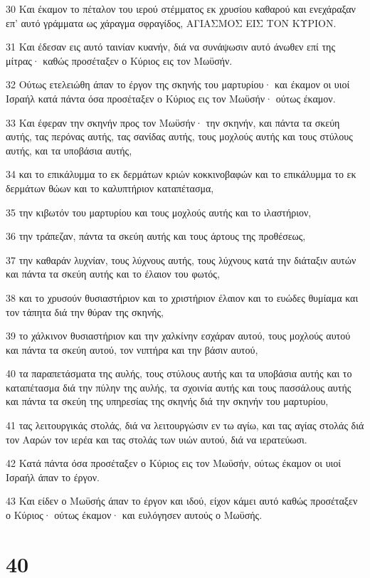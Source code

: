 \par 30 Και έκαμον το πέταλον του ιερού στέμματος εκ χρυσίου καθαρού και ενεχάραξαν επ' αυτό γράμματα ως χάραγμα σφραγίδος, ΑΓΙΑΣΜΟΣ ΕΙΣ ΤΟΝ ΚΥΡΙΟΝ.
\par 31 Και έδεσαν εις αυτό ταινίαν κυανήν, διά να συνάψωσιν αυτό άνωθεν επί της μίτρας· καθώς προσέταξεν ο Κύριος εις τον Μωϋσήν.
\par 32 Ούτως ετελειώθη άπαν το έργον της σκηνής του μαρτυρίου· και έκαμον οι υιοί Ισραήλ κατά πάντα όσα προσέταξεν ο Κύριος εις τον Μωϋσήν· ούτως έκαμον.
\par 33 Και έφεραν την σκηνήν προς τον Μωϋσήν· την σκηνήν, και πάντα τα σκεύη αυτής, τας περόνας αυτής, τας σανίδας αυτής, τους μοχλούς αυτής και τους στύλους αυτής, και τα υποβάσια αυτής,
\par 34 και το επικάλυμμα το εκ δερμάτων κριών κοκκινοβαφών και το επικάλυμμα το εκ δερμάτων θώων και το καλυπτήριον καταπέτασμα,
\par 35 την κιβωτόν του μαρτυρίου και τους μοχλούς αυτής και το ιλαστήριον,
\par 36 την τράπεζαν, πάντα τα σκεύη αυτής και τους άρτους της προθέσεως,
\par 37 την καθαράν λυχνίαν, τους λύχνους αυτής, τους λύχνους κατά την διάταξιν αυτών και πάντα τα σκεύη αυτής και το έλαιον του φωτός,
\par 38 και το χρυσούν θυσιαστήριον και το χριστήριον έλαιον και το ευώδες θυμίαμα και τον τάπητα διά την θύραν της σκηνής,
\par 39 το χάλκινον θυσιαστήριον και την χαλκίνην εσχάραν αυτού, τους μοχλούς αυτού και πάντα τα σκεύη αυτού, τον νιπτήρα και την βάσιν αυτού,
\par 40 τα παραπετάσματα της αυλής, τους στύλους αυτής και τα υποβάσια αυτής και το καταπέτασμα διά την πύλην της αυλής, τα σχοινία αυτής και τους πασσάλους αυτής και πάντα τα σκεύη της υπηρεσίας της σκηνής διά την σκηνήν του μαρτυρίου,
\par 41 τας λειτουργικάς στολάς, διά να λειτουργώσιν εν τω αγίω, και τας αγίας στολάς διά τον Ααρών τον ιερέα και τας στολάς των υιών αυτού, διά να ιερατεύωσι.
\par 42 Κατά πάντα όσα προσέταξεν ο Κύριος εις τον Μωϋσήν, ούτως έκαμον οι υιοί Ισραήλ άπαν το έργον.
\par 43 Και είδεν ο Μωϋσής άπαν το έργον και ιδού, είχον κάμει αυτό καθώς προσέταξεν ο Κύριος· ούτως έκαμον· και ευλόγησεν αυτούς ο Μωϋσής.

\chapter{40}

